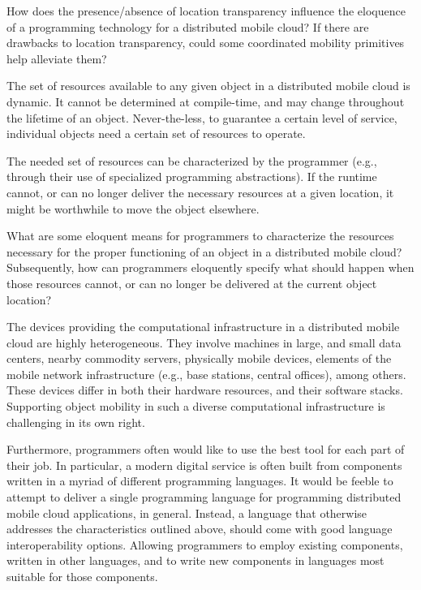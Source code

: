 \begin{research-question}

How does the presence/absence of location transparency influence the
eloquence of a programming technology for a distributed mobile cloud?
If there are drawbacks to location transparency, could some
coordinated mobility primitives help alleviate them?

\end{research-question}

The set of resources available to any given object in a distributed
mobile cloud is dynamic. It cannot be determined at compile-time, and
may change throughout the lifetime of an object. Never-the-less, to
guarantee a certain level of service, individual objects need a
certain set of resources to operate.

The needed set of resources can be characterized by the programmer
(e.g., through their use of specialized programming abstractions). If
the runtime cannot, or can no longer deliver the necessary resources
at a given location, it might be worthwhile to move the object
elsewhere.
 
\begin{research-question}

What are some eloquent means for programmers to characterize the
resources necessary for the proper functioning of an object in a
distributed mobile cloud?  Subsequently, how can programmers
eloquently specify what should happen when those resources cannot, or
can no longer be delivered at the current object location?

\end{research-question}

The devices providing the computational infrastructure in a
distributed mobile cloud are highly heterogeneous. They involve
machines in large, and small data centers, nearby commodity servers,
physically mobile devices, elements of the mobile network
infrastructure (e.g., base stations, central
offices\cite{2016-Central-office-re-architectured-as-a-data-center,
2020-5g-systems-approach}), among others.  These devices differ in
both their hardware resources, and their software stacks. Supporting
object mobility in such a diverse computational infrastructure is
challenging in its own right.

Furthermore, programmers often would like to use the best tool for
each part of their job. In particular, a modern digital service is
often built from components written in a myriad of different
programming languages. It would be feeble to attempt to deliver a
single programming language for programming distributed mobile cloud
applications, in general.  Instead, a language that otherwise
addresses the characteristics outlined above, should come with good
language interoperability options. Allowing programmers to employ
existing components, written in other languages, and to write new
components in languages most suitable for those components.

